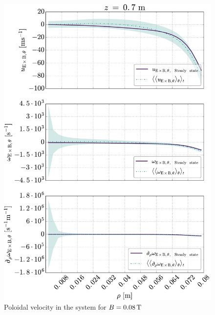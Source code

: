 \begin{figure}[htb]
    \centering
    \includegraphics[width=1.0\textwidth]{fig/results/zonal/zonalFlow0008}
    \caption{Poloidal velocity in the system for $B=0.08\, \text{T}$}
    \label{fig:zonalFlow0008}
\end{figure}
%
